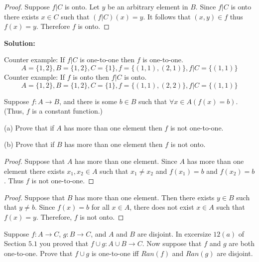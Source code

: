 \begin{proof}
    Suppose $f | C$ is onto.
    Let $y$ be an arbitrary element in $B$.
    Since $f | C$ is onto there exists $x \in C$ such that $(f | C)(x) = y$.
    It follows that $(x, y) \in f$ thus $f(x) = y$.
    Therefore $f$ is onto.
\end{proof}

\textbf{Solution:}

Counter example: If $f | C$ is one-to-one then $f$ is one-to-one.
\[A = \{1, 2\}, B = \{1, 2\}, C = \{1\}, f = \{(1, 1), (2, 1)\}, f | C = \{(1, 1)\}\]
Counter example: If $f$ is onto then $f | C$ is onto.
\[A = \{1, 2\}, B = \{1, 2\}, C = \{1\}, f = \{(1, 1), (2, 2)\}, f | C = \{(1, 1)\}\]

\begin{tcolorbox}[title=Problem 14, breakable]
    Suppose $f : A \rightarrow B$, and there is some $b \in B$
        such that $\forall{x} \in A (f(x) = b)$.
        (Thus, $f$ is a constant function.)

    (a) Prove that if $A$ has more than one element then $f$ is 
        not one-to-one.

    (b) Prove that if $B$ has more than one element then $f$ is 
        not onto.
\end{tcolorbox}

\begin{proof}
    Suppose that $A$ has more than one element.
    Since $A$ has more than one element there exists $x_1, x_2 \in A$
        such that $x_1 \ne x_2$ and $f(x_1) = b$ and $f(x_2) = b$.
    Thus $f$ is not one-to-one.
\end{proof}

\begin{proof}
    Suppose that $B$ has more than one element.
    Then there exists $y \in B$ such that $y \ne b$.
    Since $f(x) = b$ for all $x \in A$, there does not exist $x \in A$ such that $f(x) = y$.
    Therefore, $f$ is not onto.
\end{proof}

\begin{tcolorbox}[title=Problem 15, breakable]
    Suppose $f : A \rightarrow C$, $g : B \rightarrow C$,
        and $A$ and $B$ are disjoint. In excersize 
        $12(a)$ of Section $5.1$ you proved that 
        $f \cup g : A \cup B \rightarrow C$.
    Now suppose that $f$ and $g$ are both one-to-one.
    Prove that $f \cup g$ is one-to-one iff $Ran(f)$ and $Ran(g)$
        are disjoint.
\end{tcolorbox}

